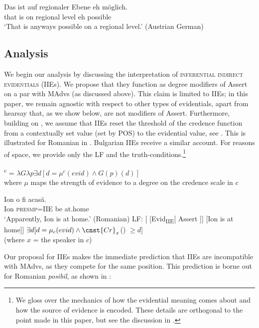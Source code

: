 \documentclass[output=paper,
]{langscibook}
\begin{document}
 	\ea \gll Das ist auf regionaler Ebene eh m\"oglich. \\ 
    	that is on regional level eh possible \\ 
		\glt `That is anyways possible on a regional level.' \hfill (Austrian German) \label{ehAG}
	\z 
    

\subsection{Analysis}
 We begin our analysis by discussing the interpretation of \textsc{inferential indirect evidentials} (IIEs). We propose  that they function as degree modifiers of Assert on a par with MAdvs (as discussed above). This claim is limited to IIEs; in this paper, we remain agnostic with respect to other types of evidentials, apart from hearsay that, as we show below, are not modifiers of Assert.  Furthermore, building on \citet{davetal07}, we assume that IIEs reset the threshold of the credence function from a contextually set value (set by POS) to the evidential value, see . This is illustrated for Romanian in . Bulgarian IIEs receive a similar account. For reasons of space, we provide only the LF and the truth-conditions.\footnote{We gloss over the mechanics of how the evidential meaning comes about and how the source of evidence is encoded. These details are orthogonal to the point made in this paper, but see the discussion in \citet{koev17}.
 } 
 
	\ea {}\textsuperscript{c} = $\lambda G\lambda p\exists d[ d = \mu^{c} (evid) \wedge G(p)(d)] $\\
    where $\mu$ maps the strength of evidence to a degree on the credence scale in $c$ \label{sxiie}
    \z 
    
 	\ea  \label{rom1} \ea \gll Ion o fi acasă. \\
 			Ion \textsc{presmp}=\textsc{IIE} be at.home \\ 
			\glt `Apparently, Ion is at home.' \hfill (Romanian)
 		\ex LF: [ [Evid\textsubscript{IIE}[ Assert ]] [Ion is at home]]
        \ex $\exists d[d = \mu_{c}(evid) \wedge  \cnst{Cr}_{x}$() $\geq d ]$ \\ (where $x$ = the speaker in $c$)
        \z \z 
        

\noindent Our proposal for IIEs makes the immediate prediction that IIEs are incompatible with MAdvs, as they compete for the same position. This prediction is borne out for Romanian \textit{posibil}, as shown in :
\end{document}
